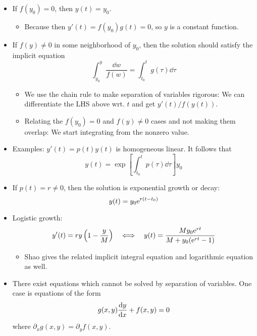 \documentclass[../notes.tex]{subfiles}
\begin{document}
\begin{itemize}
    \item If $f(y_0)=0$, then $y(t)=y_0$.
    \begin{itemize}
        \item Because then $y'(t)=f(y_0)g(t)=0$, so $y$ is a constant function.
    \end{itemize}
    \item If $f(y)\neq 0$ in some neighborhood of $y_0$, then the solution should satisfy the implicit equation
    \begin{equation*}
        \int_{y_0}^y\frac{\dd{w}}{f(w)} = \int_{t_0}^tg(\tau)\dd\tau
    \end{equation*}
    \begin{itemize}
        \item We use the chain rule to make separation of variables rigorous: We can differentiate the LHS above wrt. $t$ and get $y'(t)/f(y(t))$.
        \item Relating the $f(y_0)=0$ and $f(y)\neq 0$ cases and not making them overlap: We start integrating from the nonzero value.
    \end{itemize}
    \item Examples: $y'(t)=p(t)y(t)$ is homogeneous linear. It follows that
    \begin{equation*}
        y(t) = \exp[\int_{t_0}^tp(\tau)\dd\tau]y_0
    \end{equation*}
    \item If $p(t)=r\neq 0$, then the solution is exponential growth or decay:
    \begin{equation*}
        y(t) = y_0\e[r(t-t_0)]
    \end{equation*}
    \item Logistic growth:
    \begin{equation*}
        y'(t) = ry\left( 1-\frac{y}{M} \right)
        \quad\Longleftrightarrow\quad
        y(t) = \frac{My_0\e[rt]}{M+y_0(\e[rt]-1)}
    \end{equation*}
    \begin{itemize}
        \item Shao gives the related implicit integral equation and logarithmic equation as well.
    \end{itemize}
    \item There exist equations which cannot be solved by separation of variables. One case is equations of the form
    \begin{equation*}
        g(x,y)\dv{y}{x}+f(x,y) = 0
    \end{equation*}
    where $\partial_xg(x,y)=\partial_yf(x,y)$.

\end{itemize}
\end{document}
